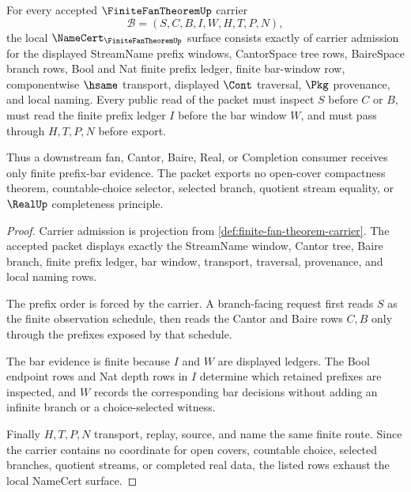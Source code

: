 \begin{theorem}
\label{thm:finite-fan-theorem-namecert-obligations}
For every accepted $\FiniteFanTheoremUp$ carrier
$$
\mathcal{B}=(S,C,B,I,W,H,T,P,N),
$$
the local $\NameCert_{\FiniteFanTheoremUp}$ surface consists exactly of carrier admission for the displayed StreamName prefix windows, CantorSpace tree rows, BaireSpace branch rows, Bool and Nat finite prefix ledger, finite bar-window row, componentwise $\hsame$ transport, displayed $\Cont$ traversal, $\Pkg$ provenance, and local naming. Every public read of the packet must inspect $S$ before $C$ or $B$, must read the finite prefix ledger $I$ before the bar window $W$, and must pass through $H,T,P,N$ before export.

Thus a downstream fan, Cantor, Baire, Real, or Completion consumer receives only finite prefix-bar evidence. The packet exports no open-cover compactness theorem, countable-choice selector, selected branch, quotient stream equality, or $\RealUp$ completeness principle.
\end{theorem}
\begin{proof}
Carrier admission is projection from \autoref{def:finite-fan-theorem-carrier}. The accepted packet displays exactly the StreamName window, Cantor tree, Baire branch, finite prefix ledger, bar window, transport, traversal, provenance, and local naming rows.

The prefix order is forced by the carrier. A branch-facing request first reads $S$ as the finite observation schedule, then reads the Cantor and Baire rows $C,B$ only through the prefixes exposed by that schedule.

The bar evidence is finite because $I$ and $W$ are displayed ledgers. The Bool endpoint rows and Nat depth rows in $I$ determine which retained prefixes are inspected, and $W$ records the corresponding bar decisions without adding an infinite branch or a choice-selected witness.

Finally $H,T,P,N$ transport, replay, source, and name the same finite route. Since the carrier contains no coordinate for open covers, countable choice, selected branches, quotient streams, or completed real data, the listed rows exhaust the local NameCert surface.
\end{proof}

